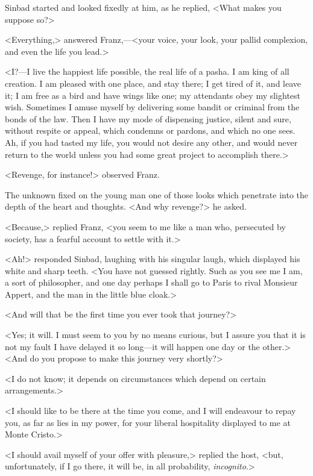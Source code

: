  Sinbad started and looked fixedly at him, as he replied, <What makes you suppose so?> 

 <Everything,> answered Franz,—<your voice, your look, your pallid complexion, and even the life you lead.> 

 <I?—I live the happiest life possible, the real life of a pasha. I am king of all creation. I am pleased with one place, and stay there; I get tired of it, and leave it; I am free as a bird and have wings like one; my attendants obey my slightest wish. Sometimes I amuse myself by delivering some bandit or criminal from the bonds of the law. Then I have my mode of dispensing justice, silent and sure, without respite or appeal, which condemns or pardons, and which no one sees. Ah, if you had tasted my life, you would not desire any other, and would never return to the world unless you had some great project to accomplish there.> 

 <Revenge, for instance!> observed Franz. 

 The unknown fixed on the young man one of those looks which penetrate into the depth of the heart and thoughts. <And why revenge?> he asked. 

 <Because,> replied Franz, <you seem to me like a man who, persecuted by society, has a fearful account to settle with it.> 

 <Ah!> responded Sinbad, laughing with his singular laugh, which displayed his white and sharp teeth. <You have not guessed rightly. Such as you see me I am, a sort of philosopher, and one day perhaps I shall go to Paris to rival Monsieur Appert, and the man in the little blue cloak.> 

 <And will that be the first time you ever took that journey?> 

 <Yes; it will. I must seem to you by no means curious, but I assure you that it is not my fault I have delayed it so long—it will happen one day or the other.>  <And do you propose to make this journey very shortly?> 

 <I do not know; it depends on circumstances which depend on certain arrangements.> 

 <I should like to be there at the time you come, and I will endeavour to repay you, as far as lies in my power, for your liberal hospitality displayed to me at Monte Cristo.> 

 <I should avail myself of your offer with pleasure,> replied the host, <but, unfortunately, if I go there, it will be, in all probability, \textit{incognito}.> 

